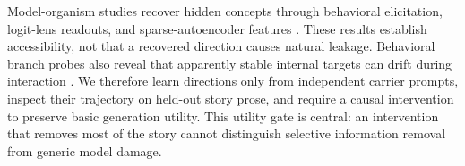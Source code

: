  Model-organism studies recover hidden concepts through behavioral elicitation, logit-lens readouts, and sparse-autoencoder features \citep{cywinski2025latent,cywinski2025eliciting}. These results establish accessibility, not that a recovered direction causes natural leakage. Behavioral branch probes also reveal that apparently stable internal targets can drift during interaction \citep{luo2026beliefs}. We therefore learn directions only from independent carrier prompts, inspect their trajectory on held-out story prose, and require a causal intervention to preserve basic generation utility. This utility gate is central: an intervention that removes most of the story cannot distinguish selective information removal from generic model damage.

